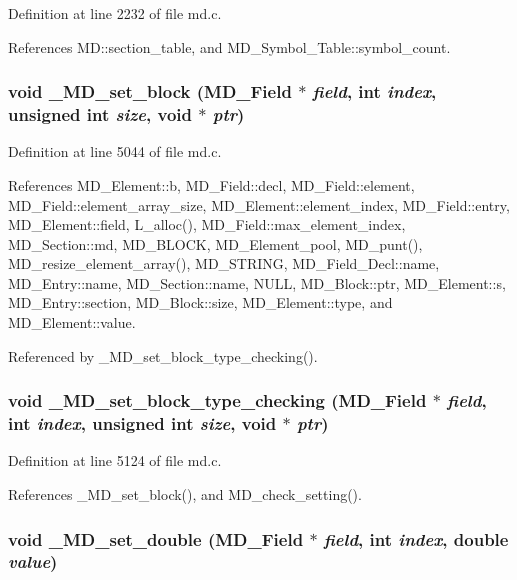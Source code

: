Definition at line 2232 of file md.c.

References MD::section\_\-table, and MD\_\-Symbol\_\-Table::symbol\_\-count.
\subsubsection{\setlength{\rightskip}{0pt plus 5cm}void \_\-MD\_\-set\_\-block (\bf{MD\_\-Field} $\ast$ {\em field}, int {\em index}, unsigned int {\em size}, void $\ast$ {\em ptr})}\label{md_8h_b820bf467a714a58efebf2bc8daeab0c}




Definition at line 5044 of file md.c.

References MD\_\-Element::b, MD\_\-Field::decl, MD\_\-Field::element, MD\_\-Field::element\_\-array\_\-size, MD\_\-Element::element\_\-index, MD\_\-Field::entry, MD\_\-Element::field, L\_\-alloc(), MD\_\-Field::max\_\-element\_\-index, MD\_\-Section::md, MD\_\-BLOCK, MD\_\-Element\_\-pool, MD\_\-punt(), MD\_\-resize\_\-element\_\-array(), MD\_\-STRING, MD\_\-Field\_\-Decl::name, MD\_\-Entry::name, MD\_\-Section::name, NULL, MD\_\-Block::ptr, MD\_\-Element::s, MD\_\-Entry::section, MD\_\-Block::size, MD\_\-Element::type, and MD\_\-Element::value.

Referenced by \_\-MD\_\-set\_\-block\_\-type\_\-checking().
\subsubsection{\setlength{\rightskip}{0pt plus 5cm}void \_\-MD\_\-set\_\-block\_\-type\_\-checking (\bf{MD\_\-Field} $\ast$ {\em field}, int {\em index}, unsigned int {\em size}, void $\ast$ {\em ptr})}\label{md_8h_72fc988aad2171bf077dbd6fd5c46233}




Definition at line 5124 of file md.c.

References \_\-MD\_\-set\_\-block(), and MD\_\-check\_\-setting().
\subsubsection{\setlength{\rightskip}{0pt plus 5cm}void \_\-MD\_\-set\_\-double (\bf{MD\_\-Field} $\ast$ {\em field}, int {\em index}, double {\em value})}\label{md_8h_00ed6c7ae245360476f3bdff84af5e4a}




